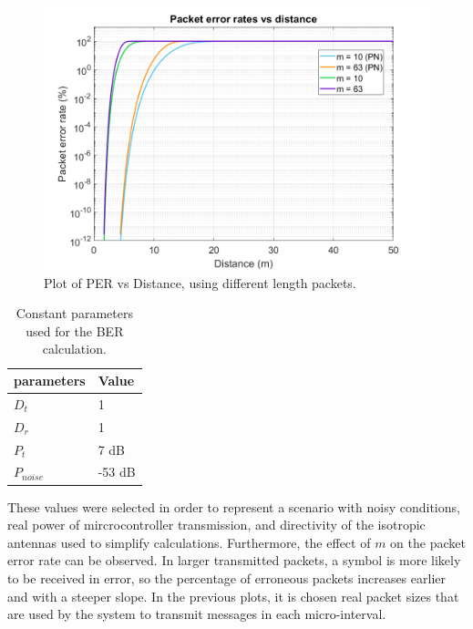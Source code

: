 \documentclass[journal]{IEEEtran}	%
\begin{document}
\begin{figure}[t!]
\centering
\includegraphics[width=0.99\columnwidth]{distance2.png}
\caption{Plot of PER vs Distance, using different length packets.}
\label{fig:distance}
\end{figure}

\begin{table}[h!]
    \renewcommand{\arraystretch}{1.25}		%
    \centering
    \caption{Constant parameters used for the BER calculation.}	%
    \label{tab:variables}
    \begin{tabular}{l|l}					%
    \hline \hline
    \textbf{parameters}        &    \textbf{Value}\\
    \hline
    $D_{t}$          &   1\\
    $D_{r}$          &   1\\
    $P_{t}$          &   7 dB\\
    $P_{noise}$      &   -53 dB\\
    \hline \hline
    \end{tabular}
\end{table}

These values were selected in order to represent a scenario with noisy conditions, real power of mircrocontroller transmission, and directivity of the isotropic antennas used to simplify calculations. Furthermore, the effect of $m$ on the packet error rate can be observed. In larger transmitted packets, a symbol is more likely to be received in error, so the percentage of erroneous packets increases earlier and with a steeper slope. In the previous plots, it is chosen real packet sizes that are used by the system to transmit messages in each micro-interval.
\end{document}
